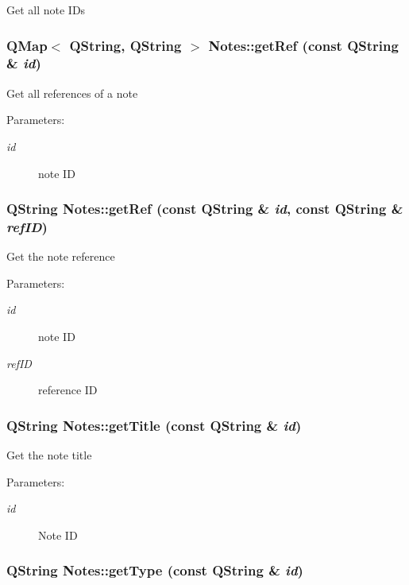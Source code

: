 Get all note IDs \hypertarget{classNotes_2452989d91340c9158210421a5d16362}{
\subsubsection[{getRef}]{\setlength{\rightskip}{0pt plus 5cm}QMap$<$ QString, QString $>$ Notes::getRef (const QString \& {\em id})}}
\label{classNotes_2452989d91340c9158210421a5d16362}


Get all references of a note \begin{Desc}
\item[Parameters:]
\begin{description}
\item[{\em id}]note ID \end{description}
\end{Desc}
\hypertarget{classNotes_e1fdbee2ecd121c81c7eb1c48404094d}{
\subsubsection[{getRef}]{\setlength{\rightskip}{0pt plus 5cm}QString Notes::getRef (const QString \& {\em id}, \/  const QString \& {\em refID})}}
\label{classNotes_e1fdbee2ecd121c81c7eb1c48404094d}


Get the note reference \begin{Desc}
\item[Parameters:]
\begin{description}
\item[{\em id}]note ID \item[{\em refID}]reference ID \end{description}
\end{Desc}
\hypertarget{classNotes_784bbf981f20f1ffc9a07c32d1f2ad2f}{
\subsubsection[{getTitle}]{\setlength{\rightskip}{0pt plus 5cm}QString Notes::getTitle (const QString \& {\em id})}}
\label{classNotes_784bbf981f20f1ffc9a07c32d1f2ad2f}


Get the note title \begin{Desc}
\item[Parameters:]
\begin{description}
\item[{\em id}]Note ID \end{description}
\end{Desc}
\hypertarget{classNotes_8fe0144e2c4f5566f1ba03545dba94e4}{
\subsubsection[{getType}]{\setlength{\rightskip}{0pt plus 5cm}QString Notes::getType (const QString \& {\em id})}}
\label{classNotes_8fe0144e2c4f5566f1ba03545dba94e4}


